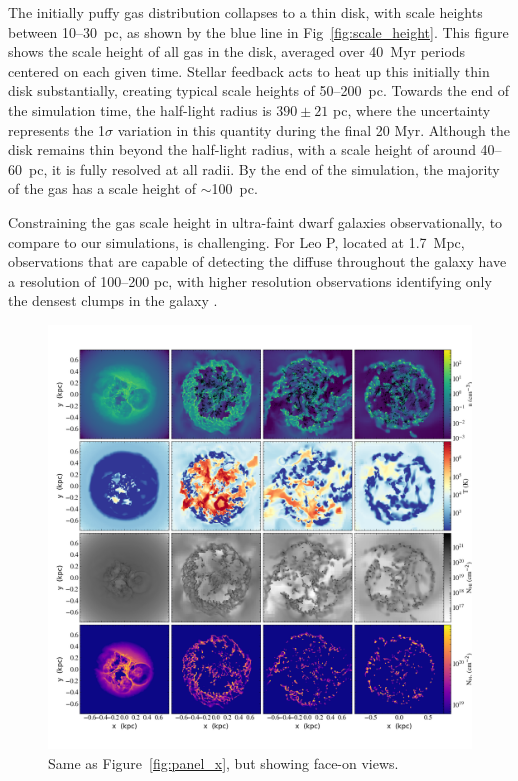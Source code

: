 \documentclass[twocolumn]{aastex61}
\begin{document}
The initially puffy gas distribution collapses to a thin disk, with scale heights between 10--30~pc, as shown by the blue line in Fig~\ref{fig:scale_height}. This figure shows the scale height of all gas in the disk, averaged over 40~Myr periods centered on each given time. Stellar feedback acts to heat up this initially thin disk substantially, creating typical scale heights of 50--200~pc. Towards the end of the simulation time, the half-light radius is $390 \pm 21$ pc, where the uncertainty represents the 1$\sigma$ variation in this quantity during the final 20 Myr. Although the disk remains thin beyond the half-light radius, with a scale height of around 40--60~pc, it is fully resolved at all radii. By the end of the simulation, the majority of the gas has a scale height of $\sim$100~pc. 

Constraining the gas scale height in ultra-faint dwarf galaxies observationally, to compare to our simulations, is challenging. For Leo P, located at 1.7~Mpc,  observations that are capable of detecting the diffuse  throughout the galaxy have a resolution of 100--200 pc, with higher resolution observations identifying only the densest  clumps in the galaxy \citep[e.g.][]{Bernstein-Cooper2014}.

\begin{figure}
\centering
\includegraphics[width=0.975\linewidth]{multiplot_4x4_z.png}
\caption{Same as Figure~\ref{fig:panel_x}, but showing face-on views.}
\label{fig:panel_z}
\end{figure}
\end{document}
